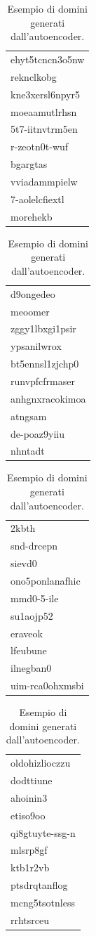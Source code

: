 \begin{table}[htbp]
\centering
	\begin{tabular}{l}
	\toprule
	ehyt5tcncn3o5nw \\
	reknclkobg \\
	kne3xersl6npyr5 \\
	moeaamutlrhsn \\
	5t7-iitnvtrm5en \\
	r-zeotn0t-wuf \\
	bgargtas \\
	vviadammpielw \\
	7-aolelcfiextl \\
	morehekb \\
	\bottomrule
	\end{tabular}
	\begin{tabular}{l}
	\toprule
	d9ongedeo  \\
	meoomer \\
	zggy1lbxgi1psir \\
	ypsanilwrox \\
	bt5ennsl1zjchp0 \\
	runvpfcfrmaser \\
	anhgnxracokimoa \\
	atngsam \\
	de-poaz9yiiu \\
	nhntadt \\
	\bottomrule
	\end{tabular}
	\begin{tabular}{l}
	\toprule
	2kbth \\
	snd-drcepn \\
	sievd0 \\
	ono5ponlanafhic \\
	mmd0-5-ile \\
	su1aojp52 \\
	eraveok \\
	lfeubune \\
	ilnegban0 \\
	uim-rca0ohxmsbi \\
	\bottomrule
	\end{tabular}
	\begin{tabular}{l}
	\toprule
	oldohizlioczzu \\
	dodttiune \\
	ahoinin3 \\
	etiso9oo \\
	qi8gtuyte-ssg-n \\
	mlsrp8gf \\
	ktb1r2vb \\
	ptsdrqtanflog \\
	mcng5tsotnless \\
	rrhtsrceu \\
	\bottomrule
	\end{tabular}

\caption{Esempio di domini generati dall'autoencoder. \label{tab:autoenc}}
\end{table}

